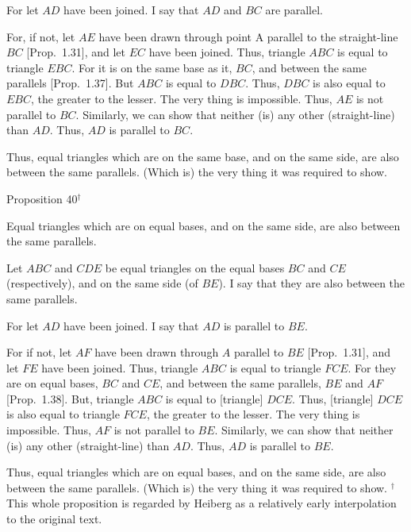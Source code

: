 \epsfysize=1.5in
\centerline{}

For let $AD$ have been joined. I say that $AD$ and $BC$ are parallel.

For, if not, let $AE$ have been drawn through point A parallel to the straight-line $BC$ [Prop.~1.31], and let $EC$ have been joined. Thus, triangle $ABC$ is equal
to triangle $EBC$. For it is on the same base as it, $BC$, and between the
same parallels [Prop.~1.37]. But $ABC$ is equal to $DBC$. Thus, $DBC$ is
also equal to $EBC$, the greater to the lesser. The very thing is impossible.
Thus, $AE$ is not parallel to $BC$. Similarly, we can show that neither (is)
any other (straight-line) than $AD$. Thus, $AD$ is parallel to $BC$.

Thus, equal triangles which are on the same base, and on the same side, are
also between the same parallels. (Which is) the very thing it was required to show.


\begin{center}
{\large Proposition 40$^\dag$}
\end{center}

Equal triangles which are on equal bases, and on the same side, are also
between the same parallels.

\epsfysize=1.5in
\centerline{}

Let $ABC$ and $CDE$ be equal triangles on the equal bases $BC$ and $CE$ (respectively), and on the same side (of $BE$). I say that they are also between
the same parallels.

For let $AD$ have been joined. I say that $AD$ is parallel to $BE$.

For if not, let $AF$ have been drawn through $A$ parallel to $BE$ [Prop.~1.31],
and let $FE$ have been joined. Thus, triangle $ABC$ is equal to triangle
$FCE$. For they are on equal bases, $BC$ and $CE$, and between the same
parallels, $BE$ and $AF$ [Prop.~1.38]. But, triangle $ABC$ is equal to [triangle] $DCE$.
Thus, [triangle] $DCE$ is also equal to triangle $FCE$, the greater to the
lesser. The very thing is impossible. 
Thus, $AF$ is not parallel to $BE$. Similarly, we can show that neither (is)
any other (straight-line) than $AD$. Thus, $AD$ is parallel to $BE$.

Thus, equal triangles which are on equal bases, and on the same side, are also
between the same parallels. (Which is) the very thing it was required to show.
{\footnotesize \noindent$^\dag$ This whole proposition is regarded by
Heiberg as a relatively early interpolation to the original text.}

